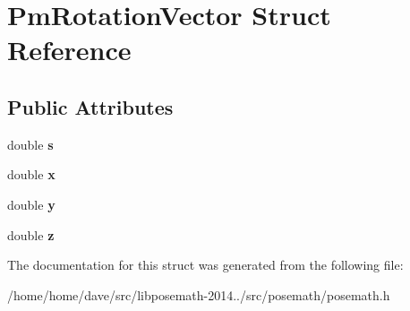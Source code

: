 \hypertarget{structPmRotationVector}{}\section{Pm\+Rotation\+Vector Struct Reference}
\label{structPmRotationVector}
\subsection*{Public Attributes}
\begin{DoxyCompactItemize}
\item 
\hypertarget{structPmRotationVector_ab52f2e4b958a2d38ce18ef7abee2a277}{}double {\bfseries s}\label{structPmRotationVector_ab52f2e4b958a2d38ce18ef7abee2a277}

\item 
\hypertarget{structPmRotationVector_a5cbee5c6028a38d43252d885b6d63ca8}{}double {\bfseries x}\label{structPmRotationVector_a5cbee5c6028a38d43252d885b6d63ca8}

\item 
\hypertarget{structPmRotationVector_ae19524f26cdd3012a6b5cc1c043c6083}{}double {\bfseries y}\label{structPmRotationVector_ae19524f26cdd3012a6b5cc1c043c6083}

\item 
\hypertarget{structPmRotationVector_a6c5fe9034f23157dd6b42286a015c6fe}{}double {\bfseries z}\label{structPmRotationVector_a6c5fe9034f23157dd6b42286a015c6fe}

\end{DoxyCompactItemize}


The documentation for this struct was generated from the following file\+:\begin{DoxyCompactItemize}
\item 
/home/home/dave/src/libposemath-\/2014../src/posemath/posemath.\+h\end{DoxyCompactItemize}
